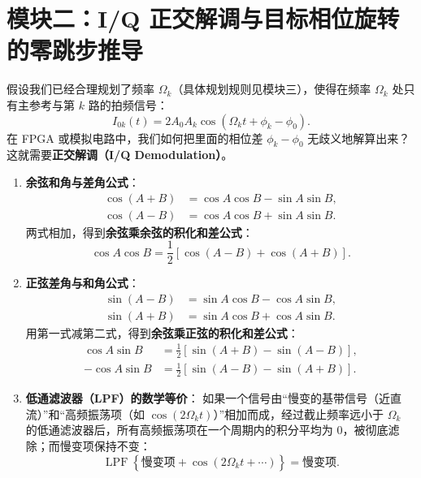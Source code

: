 \documentclass[UTF8, a4paper, 11pt]{ctexart}
\begin{document}
\section{模块二：I/Q 正交解调与目标相位旋转的零跳步推导}

假设我们已经合理规划了频率 $\Omega_k$（具体规划规则见模块三），使得在频率 $\Omega_k$ 处只有主参考与第 $k$ 路的拍频信号：
\[
    I_{0k}(t) = 2A_0 A_k \cos(\Omega_k t + \phi_k - \phi_0).
\]
在 FPGA 或模拟电路中，我们如何把里面的相位差 $\phi_k - \phi_0$ 无歧义地解算出来？这就需要\textbf{正交解调（I/Q Demodulation）}。

\begin{mathprep}
\begin{enumerate}[label=\textbf{\arabic*.}]
    \item \textbf{余弦和角与差角公式}：
    \begin{align*}
        \cos(A + B) &= \cos A \cos B - \sin A \sin B, \\
        \cos(A - B) &= \cos A \cos B + \sin A \sin B.
    \end{align*}
    两式相加，得到\textbf{余弦乘余弦的积化和差公式}：
    \[
        \cos A \cos B = \frac{1}{2}\left[ \cos(A - B) + \cos(A + B) \right].
    \]
    \item \textbf{正弦差角与和角公式}：
    \begin{align*}
        \sin(A - B) &= \sin A \cos B - \cos A \sin B, \\
        \sin(A + B) &= \sin A \cos B + \cos A \sin B.
    \end{align*}
    用第一式减第二式，得到\textbf{余弦乘正弦的积化和差公式}：
    \[
        \begin{aligned}
        \cos A \sin B &= \frac{1}{2}\left[ \sin(A + B) - \sin(A - B) \right], \\
        -\cos A \sin B &= \frac{1}{2}\left[ \sin(A - B) - \sin(A + B) \right].
        \end{aligned}
    \]
    \item \textbf{低通滤波器（LPF）的数学等价}：
    如果一个信号由“慢变的基带信号（近直流）”和“高频振荡项（如 $\cos(2\Omega_k t)$）”相加而成，经过截止频率远小于 $\Omega_k$ 的低通滤波器后，所有高频振荡项在一个周期内的积分平均为 $0$，被彻底滤除；而慢变项保持不变：
    \[
        \operatorname{LPF}\left\{ \text{慢变项} + \cos(2\Omega_k t + \cdots) \right\} = \text{慢变项}.
    \]
\end{enumerate}
\end{mathprep}
\end{document}
